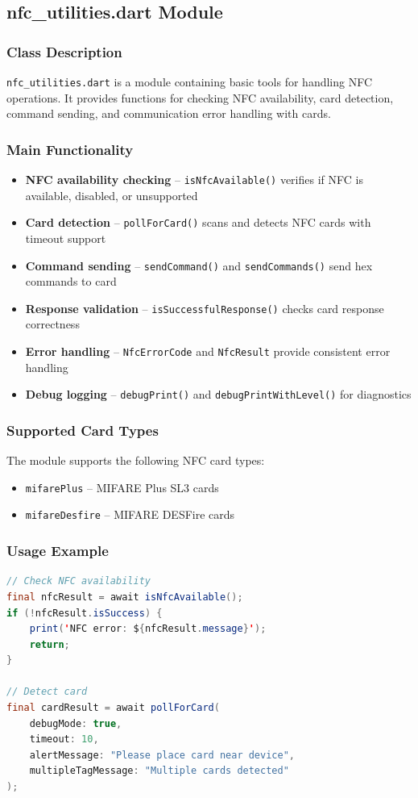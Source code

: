 \documentclass[a4paper,12pt]{article}
\begin{document}
\subsection{nfc\_utilities.dart Module}

\subsubsection{Class Description}
\texttt{nfc\_utilities.dart} is a module containing basic tools for handling NFC operations. It provides functions for checking NFC availability, card detection, command sending, and communication error handling with cards.

\subsubsection{Main Functionality}
\begin{itemize}
    \item \textbf{NFC availability checking} -- \texttt{isNfcAvailable()} verifies if NFC is available, disabled, or unsupported
    \item \textbf{Card detection} -- \texttt{pollForCard()} scans and detects NFC cards with timeout support
    \item \textbf{Command sending} -- \texttt{sendCommand()} and \texttt{sendCommands()} send hex commands to card
    \item \textbf{Response validation} -- \texttt{isSuccessfulResponse()} checks card response correctness
    \item \textbf{Error handling} -- \texttt{NfcErrorCode} and \texttt{NfcResult} provide consistent error handling
    \item \textbf{Debug logging} -- \texttt{debugPrint()} and \texttt{debugPrintWithLevel()} for diagnostics
\end{itemize}

\subsubsection{Supported Card Types}
The module supports the following NFC card types:
\begin{itemize}
    \item \texttt{mifarePlus} -- MIFARE Plus SL3 cards
    \item \texttt{mifareDesfire} -- MIFARE DESFire cards
\end{itemize}

\subsubsection{Usage Example}
\begin{lstlisting}[language=Java]
// Check NFC availability
final nfcResult = await isNfcAvailable();
if (!nfcResult.isSuccess) {
    print('NFC error: ${nfcResult.message}');
    return;
}

// Detect card
final cardResult = await pollForCard(
    debugMode: true,
    timeout: 10,
    alertMessage: "Please place card near device",
    multipleTagMessage: "Multiple cards detected"
);
\end{lstlisting}
\end{document}
